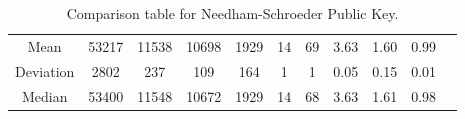\begin{table}[!ht]
{{\begin{tabular}{c|ccc|ccc|ccc|c}
                \multicolumn{1}{c|}{Mean}      & 53217                                               & 11538                                   & 10698                                  & 1929    & 14       & 69       & 3.63    & 1.60     & 0.99     & \multicolumn{1}{l}{}                                                                             \\ \cline{1-10}
                \multicolumn{1}{c|}{Deviation} & 2802                                                & 237                                     & 109                                    & 164     & 1        & 1        & 0.05    & 0.15     & 0.01     & \multicolumn{1}{l}{}                                                                             \\ \cline{1-10}
                \multicolumn{1}{c|}{Median}    & 53400                                               & 11548                                   & 10672                                  & 1929    & 14       & 68       & 3.63    & 1.61     & 0.98     & \multicolumn{1}{l}{\parbox[t]{1em}{}}  \\
            \end{tabular}
        }
    }
    \caption{Comparison table for Needham-Schroeder Public Key.}
    \label{tab:NSPK}
\end{table}